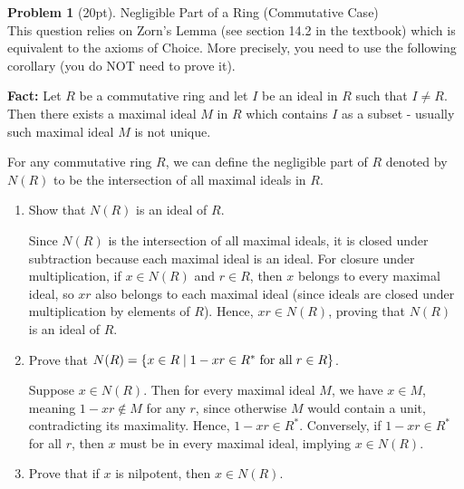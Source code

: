 \documentclass[12pt]{article}
\theoremstyle{definition}
\newtheorem{problem}{Problem}
\begin{document}
\begin{problem}[20pt] Negligible Part of a Ring (Commutative Case)\\
      This question relies on Zorn's Lemma (see section 14.2 in the textbook) which is equivalent to
      the axioms of Choice. More precisely, you need to use the following corollary (you do NOT need
      to prove it).

      \textbf{Fact:} Let $R$ be a commutative ring and let $I$ be an ideal in $R$ such that $I \neq R$.
      Then there exists a maximal ideal $M$ in $R$ which contains $I$ as a subset - usually such 
      maximal ideal $M$ is not unique.

      For any commutative ring $R$, we can define the negligible part of $R$ denoted by $N(R)$
      to be the intersection of all maximal ideals in $R$.
      \begin{enumerate}[label=\arabic*.]
            \item Show that $N(R)$ is an ideal of $R$.
            
            \begin{solution}
            Since $N(R)$ is the intersection of all maximal ideals, it is closed under subtraction because each maximal ideal is an ideal. For closure under multiplication, if $x \in N(R)$ and $r \in R$, then $x$ belongs to every maximal ideal, so $xr$ also belongs to each maximal ideal (since ideals are closed under multiplication by elements of $R$). Hence, $xr \in N(R)$, proving that $N(R)$ is an ideal of $R$.
            \end{solution}

            \item Prove that $N(R) = \{x \in R \mid 1 - xr \in R^* \hspace{3px} \text{for all} \hspace{3px} r \in R\}$.
            
            \begin{solution}
            Suppose $x \in N(R)$. Then for every maximal ideal $M$, we have $x \in M$, meaning $1 - xr \notin M$ for any $r$, since otherwise $M$ would contain a unit, contradicting its maximality. Hence, $1 - xr \in R^*$. Conversely, if $1 - xr \in R^*$ for all $r$, then $x$ must be in every maximal ideal, implying $x \in N(R)$.
            \end{solution}

            \item Prove that if $x$ is nilpotent, then $x \in N(R)$.
            

\end{enumerate}
\end{problem}
\end{document}
